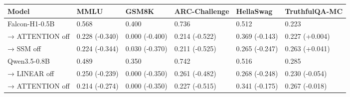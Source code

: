 \begin{tabular}{llllll}
\toprule
Model & MMLU & GSM8K & ARC-Challenge & HellaSwag & TruthfulQA-MC \\
\midrule
Falcon-H1-0.5B & 0.568 & 0.400 & 0.736 & 0.512 & 0.223 \\
  → ATTENTION off & 0.228 (-0.340) & 0.000 (-0.400) & 0.214 (-0.522) & 0.369 (-0.143) & 0.227 (+0.004) \\
  → SSM off & 0.224 (-0.344) & 0.030 (-0.370) & 0.211 (-0.525) & 0.265 (-0.247) & 0.263 (+0.041) \\
Qwen3.5-0.8B & 0.489 & 0.350 & 0.742 & 0.516 & 0.285 \\
  → LINEAR off & 0.250 (-0.239) & 0.000 (-0.350) & 0.261 (-0.482) & 0.268 (-0.248) & 0.230 (-0.054) \\
  → ATTENTION off & 0.214 (-0.274) & 0.000 (-0.350) & 0.227 (-0.515) & 0.341 (-0.175) & 0.267 (-0.018) \\
\bottomrule
\end{tabular}
